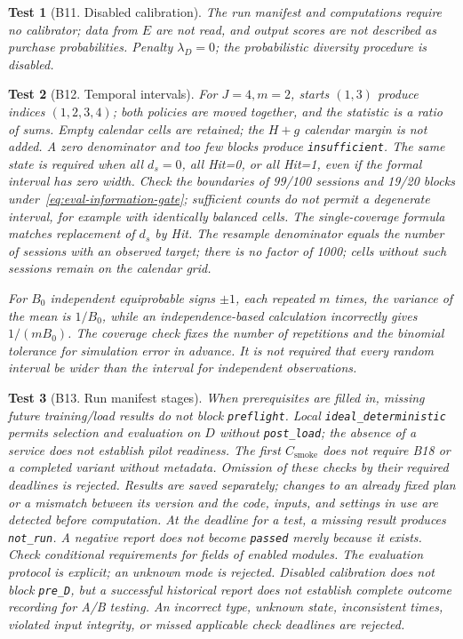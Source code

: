 \documentclass[12pt,a4paper]{article}
\newcommand{\code}[1]{{\ttfamily\small\nolinkurl{#1}}}
\theoremstyle{plainru}
\newtheorem{testcase}{Test}[section]
\begin{document}
\begin{testcase}[B11. Disabled calibration]
The run manifest and computations require no calibrator; data from $E$ are not read,
and output scores are not described as purchase probabilities.
Penalty $\lambda_D=0$; the probabilistic diversity procedure is disabled.
\end{testcase}

\begin{testcase}[B12. Temporal intervals]
For $J=4,m=2$, starts $(1,3)$ produce indices $(1,2,3,4)$;
both policies are moved together, and the statistic is a ratio of sums.
Empty calendar cells are retained; the $H+g$ calendar margin is not added.
A zero denominator and too few blocks produce \code{insufficient}.
The same state is required when all $d_s=0$, all Hit=0, or all Hit=1,
even if the formal interval has zero width.
Check the boundaries of 99/100 sessions and 19/20 blocks
under~\eqref{eq:eval-information-gate}; sufficient counts do not permit
a degenerate interval, for example with identically balanced cells.
The single-coverage formula matches replacement of $d_s$ by Hit.
The resample denominator equals
the number of sessions with an observed target; there is no factor of 1000;
cells without such sessions remain on the calendar grid.

For $B_0$ independent equiprobable signs $\pm1$,
each repeated $m$ times,
the variance of the mean is $1/B_0$, while an independence-based calculation incorrectly gives
$1/(mB_0)$. The coverage check fixes the number of repetitions
and the binomial tolerance for simulation error in advance. It is not required that
every random interval be wider than the interval for independent observations.
\end{testcase}

\begin{testcase}[B13. Run manifest stages]
When prerequisites are filled in, missing future
training/load results do not block \code{preflight}.
Local \code{ideal_deterministic} permits selection and evaluation on $D$
without \code{post_load}; the absence of a service does not establish pilot readiness.
The first $C_{\mathrm{smoke}}$ does not require B18 or a completed variant
without metadata. Omission of these checks by their
required deadlines is rejected. Results are saved separately;
changes to an already fixed plan or a mismatch between its version
and the code, inputs, and settings in use are detected before computation.
At the deadline for a test, a missing result produces \code{not_run}.
A negative report does not become \code{passed} merely because it exists.
Check conditional requirements for fields of enabled modules.
The evaluation protocol is explicit; an unknown mode is rejected.
Disabled calibration does not block \code{pre_D}, but a successful
historical report does not establish complete outcome recording for A/B testing.
An incorrect type, unknown state, inconsistent times,
violated input integrity, or missed applicable check deadlines are rejected.
\end{testcase}
\end{document}
